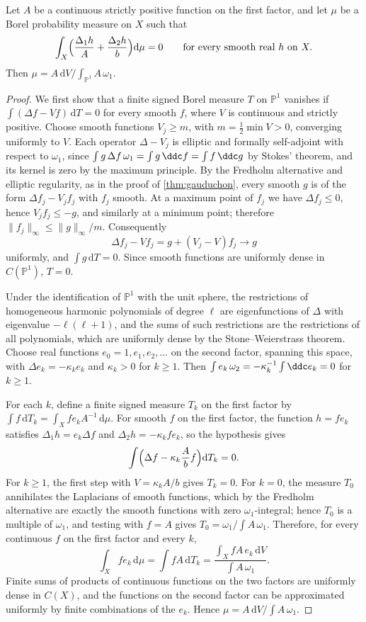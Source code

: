 \begin{lemma}\label{lem:nongauduchon-invariant-probability}
Let $A$ be a continuous strictly positive function on the first factor, and let $\mu$ be a Borel probability measure on $X$ such that
\[
 \int_X\Bigl(\frac{\Delta_1h}{A}+\frac{\Delta_2h}{b}\Bigr)\mathrm d\mu=0
 \qquad\text{for every smooth real }h\text{ on }X.
\]
Then $\mu=A\,\mathrm dV/\int_{\mathbb P^1}A\,\omega_1$.
\end{lemma}
\begin{proof}
We first show that a finite signed Borel measure $T$ on $\mathbb P^1$ vanishes if $\int(\Delta f-Vf)\,\mathrm dT=0$ for every smooth $f$, where $V$ is continuous and strictly positive. Choose smooth functions $V_j\geq m$, with $m=\frac12\min V>0$, converging uniformly to $V$. Each operator $\Delta-V_j$ is elliptic and formally self-adjoint with respect to $\omega_1$, since $\int g\,\Delta f\,\omega_1=\int g\,\ddc f=\int f\,\ddc g$ by Stokes' theorem, and its kernel is zero by the maximum principle. By the Fredholm alternative and elliptic regularity, as in the proof of \cref{thm:gauduchon}, every smooth $g$ is of the form $\Delta f_j-V_jf_j$ with $f_j$ smooth. At a maximum point of $f_j$ we have $\Delta f_j\leq0$, hence $V_jf_j\leq-g$, and similarly at a minimum point; therefore $\|f_j\|_\infty\leq\|g\|_\infty/m$. Consequently
\[
 \Delta f_j-Vf_j=g+(V_j-V)f_j\longrightarrow g
\]
uniformly, and $\int g\,\mathrm dT=0$. Since smooth functions are uniformly dense in $C(\mathbb P^1)$, $T=0$.

Under the identification of $\mathbb P^1$ with the unit sphere, the restrictions of homogeneous harmonic polynomials of degree $\ell$ are eigenfunctions of $\Delta$ with eigenvalue $-\ell(\ell+1)$, and the sums of such restrictions are the restrictions of all polynomials, which are uniformly dense by the Stone--Weierstrass theorem. Choose real functions $e_0=1,e_1,e_2,\dots$ on the second factor, spanning this space, with $\Delta e_k=-\kappa_ke_k$ and $\kappa_k>0$ for $k\geq1$. Then $\int e_k\,\omega_2=-\kappa_k^{-1}\int\ddc e_k=0$ for $k\geq1$.

For each $k$, define a finite signed measure $T_k$ on the first factor by $\int f\,\mathrm dT_k=\int_Xfe_kA^{-1}\,\mathrm d\mu$. For smooth $f$ on the first factor, the function $h=fe_k$ satisfies $\Delta_1h=e_k\Delta f$ and $\Delta_2h=-\kappa_kfe_k$, so the hypothesis gives
\[
 \int\Bigl(\Delta f-\kappa_k\frac Abf\Bigr)\mathrm dT_k=0.
\]
For $k\geq1$, the first step with $V=\kappa_kA/b$ gives $T_k=0$. For $k=0$, the measure $T_0$ annihilates the Laplacians of smooth functions, which by the Fredholm alternative are exactly the smooth functions with zero $\omega_1$-integral; hence $T_0$ is a multiple of $\omega_1$, and testing with $f=A$ gives $T_0=\omega_1/\int A\,\omega_1$. Therefore, for every continuous $f$ on the first factor and every $k$,
\[
 \int_Xfe_k\,\mathrm d\mu=\int fA\,\mathrm dT_k
 =\frac{\int_XfA\,e_k\,\mathrm dV}{\int A\,\omega_1}.
\]
Finite sums of products of continuous functions on the two factors are uniformly dense in $C(X)$, and the functions on the second factor can be approximated uniformly by finite combinations of the $e_k$. Hence $\mu=A\,\mathrm dV/\int A\,\omega_1$.
\end{proof}

